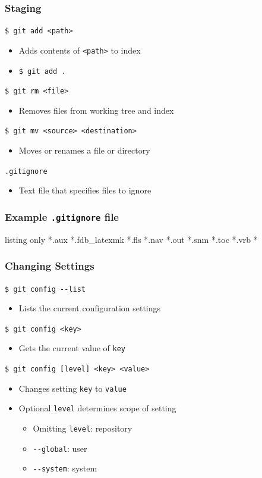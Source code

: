 \documentclass[english,compress]{beamer}
\newcommand{\cw}{\texttt} %
\begin{document}
\begin{frame}[fragile]
    \frametitle{Staging}
    \verb|$ git add <path>|
    \begin{itemize}
        \item Adds contents of \verb|<path>| to index
        \item \verb|$ git add .|
    \end{itemize}
    
    \verb|$ git rm <file>|
    \begin{itemize}
        \item Removes files from working tree and index
    \end{itemize}

    \verb|$ git mv <source> <destination>|
    \begin{itemize}
        \item Moves or renames a file or directory
    \end{itemize}
    \verb|.gitignore|
    \begin{itemize}
        \item Text file that specifies files to ignore
    \end{itemize}
\end{frame}

\begin{frame}[fragile]
    \frametitle{Example \cw{.gitignore} file}

    \begin{tcblisting}{listing only}
*.aux
*.fdb_latexmk
*.fls
*.nav
*.out
*.snm
*.toc
*.vrb
*~
    \end{tcblisting}
\end{frame}

\begin{frame}[fragile]
    \frametitle{Changing Settings}

	\verb|$ git config --list|
	\begin{itemize}
		\item Lists the current configuration settings
	\end{itemize}
	\verb|$ git config <key>|
	\begin{itemize}
		\item Gets the current value of \verb|key|
	\end{itemize}
	\verb|$ git config [level] <key> <value>|
	\begin{itemize}
		\item Changes setting \verb|key| to \verb|value|
		\item Optional \verb|level| determines scope of setting
		\begin{itemize}
			\item Omitting \verb|level|: repository
			\item \verb|--global|: user
			\item \verb|--system|: system
		\end{itemize}
	\end{itemize}
\end{frame}
\end{document}
